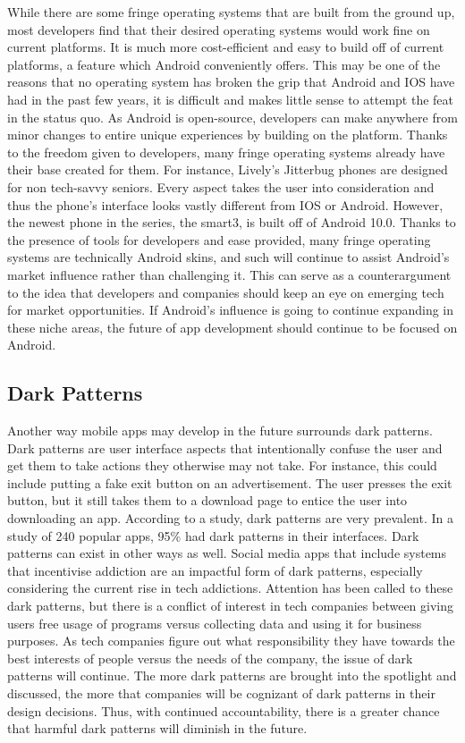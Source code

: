 \documentclass{article}
\begin{document}
While there are some fringe operating systems that are built from the ground up, most developers find that their desired operating systems would work fine on current platforms. It is much more cost-efficient and easy to build off of current platforms, a feature which Android conveniently offers. This may be one of the reasons that no operating system has broken the grip that Android and IOS have had in the past few years, it is difficult and makes little sense to attempt the feat in the status quo. As Android is open-source, developers can make anywhere from minor changes to entire unique experiences by building on the platform.\cite{brown_2022} Thanks to the freedom given to developers, many fringe operating systems already have their base created for them. For instance, Lively's Jitterbug phones are designed for non tech-savvy seniors. Every aspect takes the user into consideration and thus the phone's interface looks vastly different from IOS or Android. However, the newest phone in the series, the smart3, is built off of Android 10.0.\cite{campisano_2021} Thanks to the presence of tools for developers and ease provided, many fringe operating systems are technically Android skins, and such will continue to assist Android's market influence rather than challenging it. This can serve as a counterargument to the idea that developers and companies should keep an eye on emerging tech for market opportunities. If Android's influence is going to continue expanding in these niche areas, the future of app development should continue to be focused on Android.

\subsection{Dark Patterns}
\tab Another way mobile apps may develop in the future surrounds dark patterns. Dark patterns are user interface aspects that intentionally confuse the user and get them to take actions they otherwise may not take. For instance, this could include putting a fake exit button on an advertisement. The user presses the exit button, but it still takes them to a download page to entice the user into downloading an app. According to a study, dark patterns are very prevalent. In a study of 240 popular apps, 95\% had dark patterns in their interfaces.\cite{darkpatternsandwheretofindthem} Dark patterns can exist in other ways as well. Social media apps that include systems that incentivise addiction are an impactful form of dark patterns, especially considering the current rise in tech addictions.\cite{pretz_2016} Attention has been called to these dark patterns, but there is a conflict of interest in tech companies between giving users free usage of programs versus collecting data and using it for business purposes. As tech companies figure out what responsibility they have towards the best interests of people versus the needs of the company, the issue of dark patterns will continue. The more dark patterns are brought into the spotlight and discussed, the more that companies will be cognizant of dark patterns in their design decisions. Thus, with continued accountability, there is a greater chance that harmful dark patterns will diminish in the future.
\end{document}
